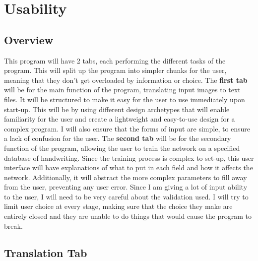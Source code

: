 \documentclass{report}
\begin{document}
\section{Usability}
\subsection{Overview}
This program will have 2 tabs, each performing the different tasks of the program. This will split up the program into simpler chunks for the user, meaning that they don't get overloaded by information or choice. 
\newline
\newline
The \textbf{first tab} will be for the main function of the program, translating input images to text files. It will be structured to make it easy for the user to use immediately upon start-up. This will be by using different design archetypes that will enable familiarity for the user and create a lightweight and easy-to-use design for a complex program. I will also ensure that the forms of input are simple, to ensure a lack of confusion for the user.
\newline
\newline
The \textbf{second tab} will be for the secondary function of the program, allowing the user to train the network on a specified database of handwriting. Since the training process is complex to set-up, this user interface will have explanations of what to put in each field and how it affects the network. Additionally, it will abstract the more complex parameters to fill away from the user, preventing any user error.
\newline
\newline
Since I am giving a lot of input ability to the user, I will need to be very careful about the validation used. I will try to limit user choice at every stage, making sure that the choice they make are entirely closed and they are unable to do things that would cause the program to break.

\subsection{Translation Tab}
\end{document}
